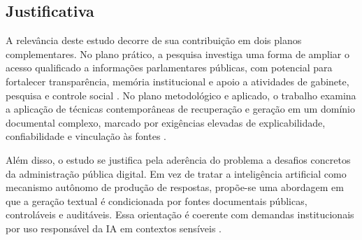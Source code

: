 \subsection{Justificativa}

A relevância deste estudo decorre de sua contribuição em dois planos complementares. No plano prático, a pesquisa investiga uma forma de ampliar o acesso qualificado a informações parlamentares públicas, com potencial para fortalecer transparência, memória institucional e apoio a atividades de gabinete, pesquisa e controle social \parencite{ipu2024aiParliaments,geunis2023parliamentaryMonitoring}. No plano metodológico e aplicado, o trabalho examina a aplicação de técnicas contemporâneas de recuperação e geração em um domínio documental complexo, marcado por exigências elevadas de explicabilidade, confiabilidade e vinculação às fontes \parencite{martelloteViola2025organizacaoConhecimento,wfd2023guidelinesAiParliaments}.

Além disso, o estudo se justifica pela aderência do problema a desafios concretos da administração pública digital. Em vez de tratar a inteligência artificial como mecanismo autônomo de produção de respostas, propõe-se uma abordagem em que a geração textual é condicionada por fontes documentais públicas, controláveis e auditáveis. Essa orientação é coerente com demandas institucionais por uso responsável da IA em contextos sensíveis \parencite{deAlmeidaSantos2025aiGovernance,wfd2023guidelinesAiParliaments}.
